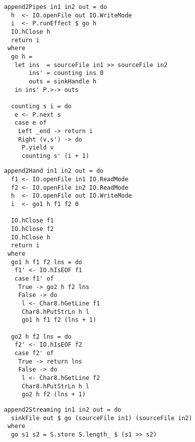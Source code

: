 \begin{lstlisting}[float,label=l:a:bench:append2Pipes,caption=Pipes implementation of \Hs/append2/]
append2Pipes in1 in2 out = do
  h  <- IO.openFile out IO.WriteMode
  i  <- P.runEffect $ go h
  IO.hClose h
  return i
 where
  go h =
   let ins  = sourceFile in1 >> sourceFile in2
       ins' = counting ins 0
       outs = sinkHandle h
   in ins' P.>-> outs 

  counting s i = do
   e <- P.next s
   case e of
    Left _end -> return i
    Right (v,s') -> do
     P.yield v
     counting s' (i + 1)
\end{lstlisting}

\begin{lstlisting}[float,label=l:a:bench:append2Hand,caption=Hand-fused implementation of \Hs/append2/]
append2Hand in1 in2 out = do
  f1 <- IO.openFile in1 IO.ReadMode
  f2 <- IO.openFile in2 IO.ReadMode
  h  <- IO.openFile out IO.WriteMode
  i  <- go1 h f1 f2 0

  IO.hClose f1
  IO.hClose f2
  IO.hClose h
  return i
 where
  go1 h f1 f2 lns = do
   f1' <- IO.hIsEOF f1
   case f1' of
    True -> go2 h f2 lns
    False -> do
     l <- Char8.hGetLine f1
     Char8.hPutStrLn h l
     go1 h f1 f2 (lns + 1)

  go2 h f2 lns = do
   f2' <- IO.hIsEOF f2
   case f2' of
    True -> return lns
    False -> do
     l <- Char8.hGetLine f2
     Char8.hPutStrLn h l
     go2 h f2 (lns + 1)
\end{lstlisting}

\begin{lstlisting}[float,label=l:a:bench:append2Streaming,caption=Streaming implementation of \Hs/append2/]
append2Streaming in1 in2 out = do
  sinkFile out $ go (sourceFile in1) (sourceFile in2)
 where
  go s1 s2 = S.store S.length_ $ (s1 >> s2)
\end{lstlisting}

% 
% 

